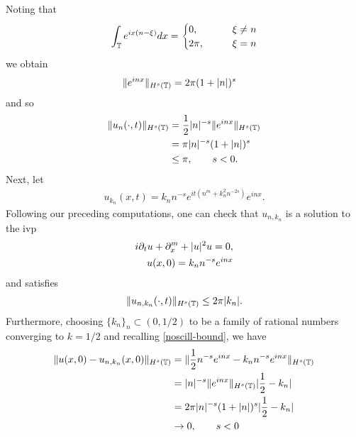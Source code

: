 %
%
Noting that
%
\begin{equation*}
	\begin{split}
		\int_{\mathbb{T}}e^{ix(n - \xi)}dx =
		\begin{cases}0, \qquad & \xi \neq n 
			\\
			2 \pi, \qquad & \xi = n 
		\end{cases}
	\end{split}
\end{equation*}
%
%
we obtain
%
%
\begin{equation}
	\label{noscill-bound}
	\begin{split}
		\|e^{inx}\|_{H^{s}(\mathbb{T})} & = 2 \pi (1 + | n |)^{s}
	\end{split}
\end{equation}
%
%
and so
%
%
\begin{equation*}
	\begin{split}
		\|u_{n}(\cdot, t)\|_{H^s{(\mathbb{T})}}
    & = \frac{1}{2}|n|^{-s}\|e^{inx}\|_{H^{s}(\mathbb{T})}
    \\
    & = \pi |n|^{-s} (1 + | n |)^{s} 
    \\
    & \le \pi, \qquad s < 0.
	\end{split}
\end{equation*}
%
%
Next, let
%
%
\begin{equation*}
	\begin{split}
		u_{k_{n}}(x,t) = k_{n}n^{-s}e^{it\left( n^{m} + k_{n}^2 n^{-2s}
		\right)}e^{inx}.
	\end{split}
\end{equation*}
%
%
Following our preceding computations, one can check that $u_{n, k_{n}}$ is a solution to the ivp
%
%
\begin{equation}
	\label{nfamily-ivp}
	\begin{split}
		i\partial_t u + \partial_x^{m} + | u |^{2}u = 0,
		\\
		u(x,0) = k_{n}n^{-s}e^{inx}
	\end{split}
\end{equation}
%
%
and satisfies 
%
%
\begin{equation*}
	\begin{split}
		\|u_{n, k_{n}}(\cdot, t)\|_{H^{s}(\mathbb{T})} \le 2 \pi |k_{n}|.
	\end{split}
\end{equation*}
%
%
Furthermore, choosing $\{k_{n}\}_{n} \subset (0, 1/2)$ to be a family of
rational numbers converging to $k =1/2$ and recalling \eqref{noscill-bound}, we
have
%
%
\begin{equation*}
	\begin{split}
		\|u(x,0) - u_{n, k_{n}}(x, 0) \|_{H^s(\mathbb{T})} 
		& =
		\|\frac{1}{2}n^{-s}e^{inx} - k_{n}n^{-s}e^{inx} \|_{H^s(\mathbb{T})}
		\\
		& = | n |^{-s} \|e^{inx}\|_{H^s(\mathbb{T})}|\frac{1}{2} - k_{n}|
		\\
    & = 2 \pi |n|^{-s}(1+| n |)^{s} |\frac{1}{2} - k_{n}|
    \\
    & \to 0, \qquad s < 0
	\end{split}
\end{equation*}
